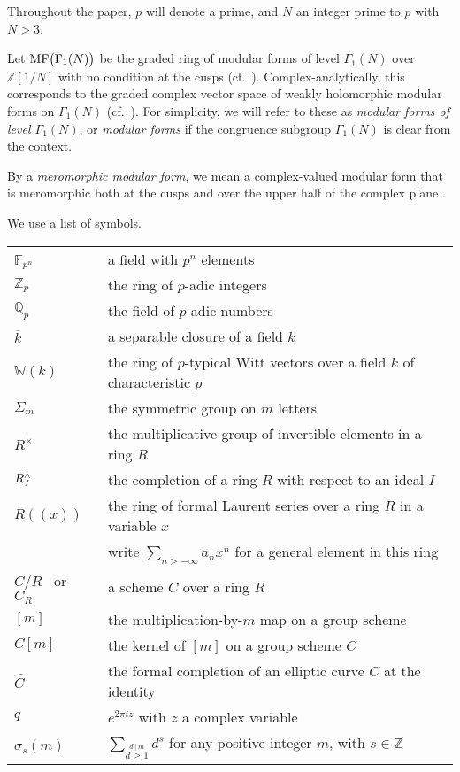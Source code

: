 \documentclass{gtpart}
\theoremstyle{definition}
\theoremstyle{remark}
\newcommand{\mb}[1]{\mathbb{#1}}
\newcommand{\BF}{{\mb F}}
\newcommand{\BQ}{{\mb Q}}
\newcommand{\BW}{{\mb W}}
\newcommand{\BZ}{{\mb Z}}
\newcommand{\HC}{\widehat{C~}\!}
\newcommand{\MF}{{\rm MF}}
\newcommand{\G}{\Gamma}
\newcommand{\si}{\sigma}
\renewcommand{\=}{\approx}
\renewcommand{\-}{\sim}
\numberwithin{equation}{section}
\begin{document}
Throughout the paper, $p$ will denote a prime, and $N$ an integer prime to $p$ 
with $N > 3$.  

Let $\MF\big(\G_1(N)\big)$ be the graded ring of modular forms of level 
$\G_1(N)$ over $\BZ[1/N]$ with no condition at the cusps 
(cf.~\cite[Section 1.2]{padicprop}).  Complex-analytically, this corresponds to 
the graded complex vector space of weakly holomorphic modular forms on $\G_1(N)$ 
(cf.~\cite[Definition 1.12]{web}).  For simplicity, we will refer to these as 
{\em modular forms of level $\G_1(N)$}, or {\em modular forms} if the congruence 
subgroup $\G_1(N)$ is clear from the context.  

By a {\em meromorphic modular form}, we mean a complex-valued modular form that 
is meromorphic both at the cusps and over the upper half of the complex plane 
\cite[Definition 1.8]{web}.  

We use a list of symbols.  
\begin{center}
 \begin{tabular}{ll}
  $\BF_{p^n}$ \qquad\qquad\, & a field with $p^n$ elements \\
  $\BZ_p$ & the ring of $p$-adic integers \\
  $\BQ_p$ & the field of $p$-adic numbers \\
  $\overline{k}$ & a separable closure of a field $k$ \\
  $\BW(k)$ & the ring of $p$-typical Witt vectors over a field $k$ of 
             characteristic $p$ \\
  $\Sigma_m$ & the symmetric group on $m$ letters \\
  $R^\times$ & the multiplicative group of invertible elements in a ring $R$ \\
  $R_{\hskip .02cm I}^\wedge$ & the completion of a ring $R$ with respect to an 
                                ideal $I$ \\
  $R(\!(x)\!)$ & the ring of formal Laurent series over a ring $R$ in a variable 
                 $x$ \\
               & write $\sum_{n > -\infty} a_n x^n$ for a general element in 
                 this ring \\
  $C/R$ \, or \, $C_R$ & a scheme $C$ over a ring $R$ \\
  $[m]$ & the multiplication-by-$m$ map on a group scheme \\
  $C[m]$ & the kernel of $[m]$ on a group scheme $C$ \\
  $\HC$ & the formal completion of an elliptic curve $C$ at the identity \\
  $q$ & $e^{2 \pi i z}$ with $z$ a complex variable \\
  $\si_s(m)$ & $\displaystyle \sum_{\stackrel{\scriptstyle d~\!|~\!m}{d \geq 1}} 
               d^s$ for any positive integer $m$, with $s \in \BZ$ 
 \end{tabular}
\end{center}
\end{document}
